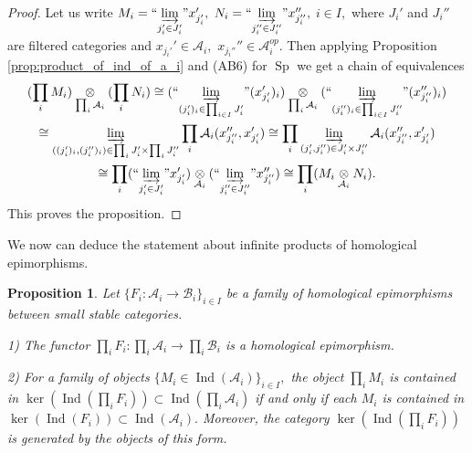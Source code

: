 \documentclass[11pt,leqno]{amsart}
\newtheorem{prop}[theo]{Proposition}
\numberwithin{equation}{section}
\newcommand{\tens}[1]{%
  \mathbin{\mathop{\otimes}\displaylimits_{#1}}%
}
\newcommand{\indlim}[1][]{\mathop{\varinjlim}\limits_{#1}}
\newcommand{\inddlim}[1][]{{``{\indlim[#1]}"}}
\newcommand{\prodd}[1][]{\mathop{\prod}\limits_{#1}}
\newcommand{\cA}{{\mathcal A}}
\newcommand{\cB}{{\mathcal B}}
\newcommand{\Sp}{\operatorname{Sp}}
\newcommand{\Ind}{\operatorname{Ind}}
\begin{document}
\begin{proof}Let us write $M_i=\inddlim[j_i'\in J_i']x_{j_i'}',$ $N_i=\inddlim[j_i''\in J_i'']x_{j_i''}'',$ $i\in I,$ where $J_i'$ and $J_i''$ are filtered categories and $x_{j_i'}'\in\cA_i,$ $x_{j_i''}''\in\cA_i^{op}$. Then applying Proposition \ref{prop:product_of_ind_of_a_i} and (AB6) for $\Sp$ we get a chain of equivalences 
\begin{multline*}(\prod_i M_i)\tens{\prod_i\cA_i}(\prod_i N_i)\cong (\inddlim[(j_i')_i\in\prod_{i\in I}J_i'](x_{j_i'}')_i)\tens{\prod_i\cA_i}(\inddlim[(j_i'')_i\in\prod_{i\in I}J_i''](x_{j_i''}'')_i)\\ \cong
\indlim[((j_i')_i,(j_i'')_i)\in\prod_i J_i'\times\prod_i J_i'']\prod_i\cA_i(x_{j_i''}'',x_{j_i'}')\cong\prod_i\indlim[(j_i',j_i'')\in J_i'\times J_i'']\cA_i(x_{j_i''}'',x_{j_i'}')\\ \cong
\prodd[i] (\inddlim[j_i'\in J_i']x_{j_i'}')\tens{\cA_i}(\inddlim[j_i''\in J_i'']x_{j_i''}'')\cong \prod_i (M_i\tens{\cA_i}N_i).
 \end{multline*}
This proves the proposition.
\end{proof}


We now can deduce the statement about infinite products of homological epimorphisms. 

\begin{prop}\label{prop:products_of_hom_epi}Let $\{F_i:\cA_i\to\cB_i\}_{i\in I}$ be a family of homological epimorphisms between small stable categories. 

1) The functor $\prod_i F_i:\prod_i\cA_i\to\prod_i\cB_i$ is a homological epimorphism.

2) For a family of objects $\{M_i\in \Ind(\cA_i)\}_{i\in I},$ the object $\prod_i M_i$ is contained in $\ker(\Ind(\prod_i F_i))\subset\Ind(\prod_i\cA_i)$ if and only if each $M_i$ is contained in $\ker(\Ind(F_i))\subset\Ind(\cA_i).$ Moreover, the category $\ker(\Ind(\prod_i F_i))$ is generated by the objects of this form.\end{prop}
\end{document}
